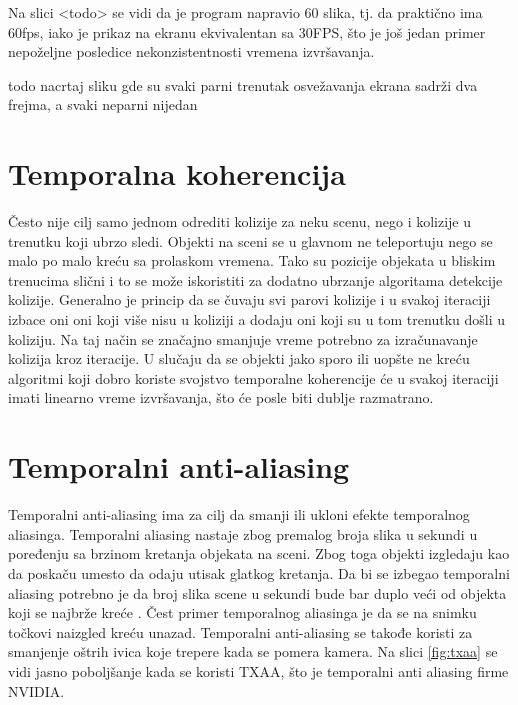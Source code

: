 \documentclass[12pt,oneside]{memoir}
\begin{document}
Na slici <todo> se vidi da je program napravio 60 slika, tj. da praktično ima 60fps, iako je prikaz na ekranu 
ekvivalentan sa 30FPS, što je još jedan primer nepoželjne posledice nekonzistentnosti vremena izvršavanja. 

todo nacrtaj sliku gde su svaki parni trenutak osvežavanja ekrana sadrži dva frejma, a svaki neparni 
nijedan


\section{Temporalna koherencija}

Često nije cilj samo jednom odrediti kolizije za neku scenu, nego i kolizije u trenutku koji ubrzo sledi.
Objekti na sceni se u glavnom ne teleportuju nego se malo po malo kreću sa prolaskom vremena.
Tako su pozicije objekata u bliskim trenucima slični i to se može iskoristiti za dodatno ubrzanje algoritama 
detekcije kolizije. Generalno je princip da se čuvaju svi parovi kolizije i u svakoj iteraciji 
izbace oni oni koji više nisu u koliziji a dodaju oni koji su u tom trenutku došli u koliziju.
Na taj način se značajno smanjuje vreme potrebno za izračunavanje kolizija kroz iteracije.
U slučaju da se objekti jako sporo ili uopšte ne kreću algoritmi koji dobro koriste svojstvo temporalne 
koherencije će u svakoj iteraciji imati linearno vreme izvršavanja, što će posle biti dublje razmatrano. 


\section{Temporalni anti-aliasing}

Temporalni anti-aliasing ima za cilj da smanji ili ukloni efekte temporalnog aliasinga.
Temporalni aliasing nastaje zbog premalog broja slika u sekundi u poređenju sa brzinom kretanja objekata na sceni.
Zbog toga objekti izgledaju kao da poskaču  umesto da odaju utisak glatkog kretanja.
Da bi se izbegao temporalni aliasing potrebno je da broj slika scene u sekundi bude bar duplo veći 
od objekta koji se najbrže kreće \cite{Grant}. Čest primer temporalnog aliasinga je da se na snimku točkovi naizgled 
kreću unazad.
Temporalni anti-aliasing se takođe koristi za smanjenje oštrih ivica koje trepere kada se pomera kamera.
Na slici \ref{fig:txaa} se vidi jasno poboljšanje kada se koristi TXAA, što je temporalni anti
aliasing firme NVIDIA.
\end{document}
